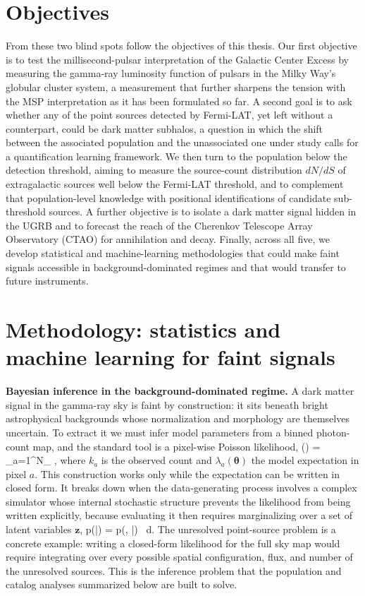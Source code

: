 \section*{Objectives}
From these two blind spots follow the objectives of this thesis. Our first objective is to test the millisecond-pulsar interpretation of the Galactic Center Excess by measuring the gamma-ray luminosity function of pulsars in the Milky Way's globular cluster system, a measurement that further sharpens the tension with the MSP interpretation as it has been formulated so far. A second goal is to ask whether any of the point sources detected by Fermi-LAT, yet left without a counterpart, could be dark matter subhalos, a question in which the shift between the associated population and the unassociated one under study calls for a quantification learning framework. We then turn to the population below the detection threshold, aiming to measure the source-count distribution $dN/dS$ of extragalactic sources well below the Fermi-LAT threshold, and to complement that population-level knowledge with positional identifications of candidate sub-threshold sources. A further objective is to isolate a dark matter signal hidden in the UGRB and to forecast the reach of the Cherenkov Telescope Array Observatory (CTAO) for annihilation and decay. Finally, across all five, we develop statistical and machine-learning methodologies that could make faint signals accessible in background-dominated regimes and that would transfer to future instruments.

\section*{Methodology: statistics and machine learning for faint signals}
\textbf{Bayesian inference in the background-dominated regime.} A dark matter signal in the gamma-ray sky is faint by construction: it sits beneath bright astrophysical backgrounds whose normalization and morphology are themselves uncertain. To extract it we must infer model parameters from a binned photon-count map, and the standard tool is a pixel-wise Poisson likelihood,
\be
{}(\boldsymbol{\theta}) = \prod_{a=1}^{N_{}} ,
\ee
where $k_a$ is the observed count and $\lambda_a(\boldsymbol{\theta})$ the model expectation in pixel $a$. This construction works only while the expectation can be written in closed form. It breaks down when the data-generating process involves a complex simulator whose internal stochastic structure prevents the likelihood from being written explicitly, because evaluating it then requires marginalizing over a set of latent variables $\mathbf{z}$,
\be
p(|\boldsymbol{\theta}) = \int p(, |\boldsymbol{\theta}) \, d.
\ee
The unresolved point-source problem is a concrete example: writing a closed-form likelihood for the full sky map would require integrating over every possible spatial configuration, flux, and number of the unresolved sources. This is the inference problem that the population and catalog analyses summarized below are built to solve.

